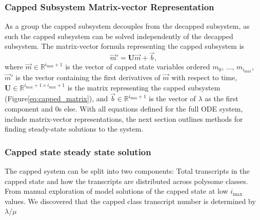 \documentclass[a4,center,fleqn,nocrop]{NAR}
\newcommand{\imax}{\ensuremath{{i_{\max}}}\xspace}
\let\bs\boldsymbol
\begin{document}
\subsubsection{Capped Subsystem Matrix-vector Representation}
As a group the capped subsystem decouples from the decapped subsystem, as such the capped subsystem can be solved independently of the decapped subsystem.  
The matrix-vector formula representing the capped subsystem is \begin{equation}
\vec{m}'=\bs{U}\vec{m}+\vec{b},\end{equation} where $\vec{m}\in\mathbb{R}^{\imax+1}$ is the vector of capped state variables ordered $m_0$, ..., $m_{\imax}$, $\vec{m}'$ is the vector containing the first derivatives of $\vec{m}$ with respect to time, $\bs{U}\in\mathbb{R}^{\imax+1\times \imax+1}$ is the matrix representing the capped subsystem (Figure\ref{eq:capped_matrix}), and $\vec{b}\in\mathbb{R}^{\imax+1}$ is the vector of $\lambda$ as the first component and 0s else.
With all equations defined for the full ODE system, include matrix-vector representations, the next section outlines methods for finding steady-state solutions to the system.


\subsubsection{Capped state steady state solution}

The capped system can be split into two components: Total transcripts in the capped state and how the transcripts are distributed across polysome classes. 
From manual exploration of model solutions of the capped state at low \imax values. 
We discovered that the capped class transcript number is determined by $\lambda/ \mu$
	
\end{document}
